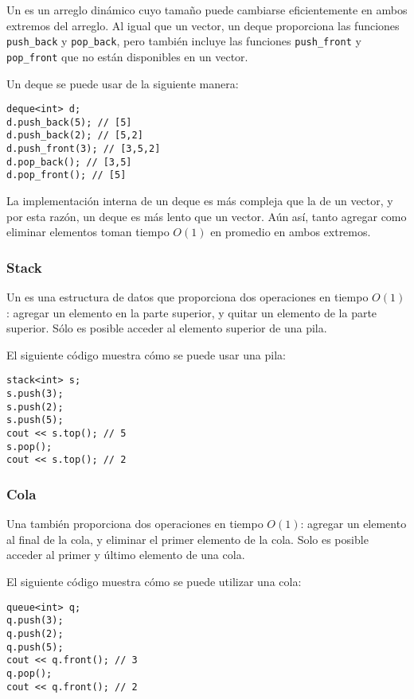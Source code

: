 
Un  es un arreglo dinámico
cuyo tamaño puede cambiarse eficientemente
en ambos extremos del arreglo.
Al igual que un vector, un deque proporciona las funciones
\texttt{push\_back} y \texttt{pop\_back}, pero
también incluye las funciones
\texttt{push\_front} y \texttt{pop\_front}
que no están disponibles en un vector.

Un deque se puede usar de la siguiente manera:
\begin{lstlisting}
deque<int> d;
d.push_back(5); // [5]
d.push_back(2); // [5,2]
d.push_front(3); // [3,5,2]
d.pop_back(); // [3,5]
d.pop_front(); // [5]
\end{lstlisting}

La implementación interna de un deque
es más compleja que la de un vector,
y por esta razón, un deque es más lento que un vector.
Aún así, tanto agregar como eliminar
elementos toman tiempo $O(1)$ en promedio en ambos extremos.

\subsubsection{Stack}


Un 
es una estructura de datos que proporciona dos
operaciones en tiempo $O(1)$:
agregar un elemento en la parte superior,
y quitar un elemento de la parte superior.
Sólo es posible acceder al elemento superior
de una pila.

El siguiente código muestra cómo se puede usar una pila:
\begin{lstlisting}
stack<int> s;
s.push(3);
s.push(2);
s.push(5);
cout << s.top(); // 5
s.pop();
cout << s.top(); // 2
\end{lstlisting}
\subsubsection{Cola}


Una  también
proporciona dos operaciones en tiempo $O(1)$:
agregar un elemento al final de la cola,
y eliminar el primer elemento de la cola.
Solo es posible acceder al primer
y último elemento de una cola.

El siguiente código muestra cómo se puede utilizar una cola:
\begin{lstlisting}
queue<int> q;
q.push(3);
q.push(2);
q.push(5);
cout << q.front(); // 3
q.pop();
cout << q.front(); // 2
\end{lstlisting}

